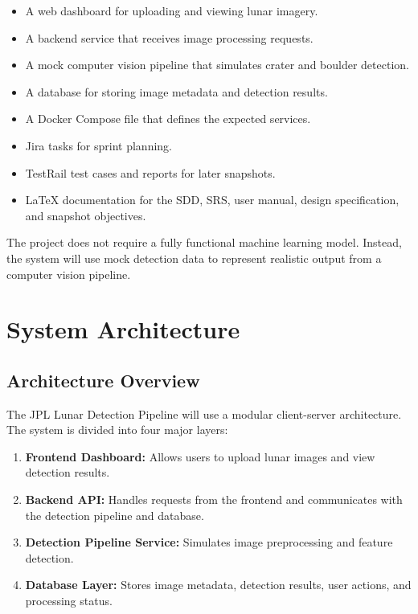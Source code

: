 \documentclass[12pt]{article}
\begin{document}
\begin{itemize}
    \item A web dashboard for uploading and viewing lunar imagery.
    \item A backend service that receives image processing requests.
    \item A mock computer vision pipeline that simulates crater and boulder detection.
    \item A database for storing image metadata and detection results.
    \item A Docker Compose file that defines the expected services.
    \item Jira tasks for sprint planning.
    \item TestRail test cases and reports for later snapshots.
    \item LaTeX documentation for the SDD, SRS, user manual, design specification, and snapshot objectives.
\end{itemize}

The project does not require a fully functional machine learning model. Instead, the system will use mock detection data to represent realistic output from a computer vision pipeline.

\section{System Architecture}

\subsection{Architecture Overview}

The JPL Lunar Detection Pipeline will use a modular client-server architecture. The system is divided into four major layers:

\begin{enumerate}
    \item \textbf{Frontend Dashboard:} Allows users to upload lunar images and view detection results.
    \item \textbf{Backend API:} Handles requests from the frontend and communicates with the detection pipeline and database.
    \item \textbf{Detection Pipeline Service:} Simulates image preprocessing and feature detection.
    \item \textbf{Database Layer:} Stores image metadata, detection results, user actions, and processing status.
\end{enumerate}
\end{document}
